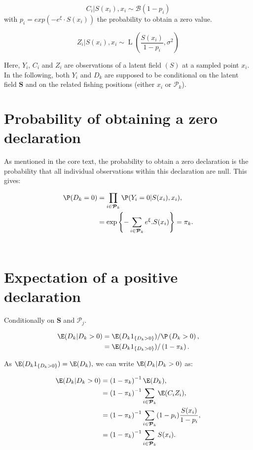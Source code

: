 \[C_{i} \vert S(x_i),x_i \sim \mathcal{B}(1-p_{i})\]
with \(p_{i}=exp(-e^\xi \cdot S(x_{i}))\) the probability to obtain a zero value.

\[Z_{i} \vert S(x_i),x_i \sim \operatorname{L}(\frac{S(x_{i})}{1-p_{i}},\sigma^2)\]

Here, \(Y_{i}\), \(C_{i}\) and \(Z_{i}\) are observations of a latent field $(S)$ at a sampled point \(x_{i}\). In the following, both \(Y_i\) and \(D_k\) are supposed to be conditional on the latent field \(\bm{S}\) and on the related fishing positions (either \(x_i\) or \(\boldsymbol{\mathcal{P}}_k\)). \\

\section{Probability of obtaining a zero declaration}

As mentioned in the core text, the probability to obtain a zero declaration is the probability that all individual observations within this declaration are null. This gives:

\begin{align*}
\P(D_k = 0) & = \prod_{i \in \boldsymbol{\mathcal{P}}_k} \P(Y_{i} = 0 \vert  S(x_i), x_i),\nonumber \\
                      & = \exp{ \left \lbrace- \sum_{i \in \boldsymbol{\mathcal{P}}_k} e^{\xi}. S(x_{i})\right \rbrace} = \pi_k.
\end{align*} \\

\newpage
\section{Expectation of a positive declaration}

Conditionally on \(\bm{S}\) and \(\boldsymbol{\mathcal{P}}_j\).

\begin{align*}
\E(D_k \vert D_k > 0) & = \E(D_k 1_{ \left \lbrace D_k > 0\right\rbrace } )  / \P\left ( D_k > 0\right ),   \\
& = \E(D_k 1_{ \left \lbrace D_k > 0\right\rbrace } )  / \left (1-\pi_k\right).   \\
\end{align*}

As \(\E(D_k 1_{ \left \lbrace D_k > 0\right\rbrace } ) = \E(D_k ),\) we can write \(\E(D_k\vert D_k > 0)\) as:

\begin{align*}
\E(D_k\vert D_k > 0) & = \left (1- \pi_k\right)^{-1} \E(D_k)   ,   \nonumber \\
& = \left (1- \pi_k\right)^{-1} \sum_{i \in \boldsymbol{\mathcal{P}}_k} \E(C_{i} Z_{i}),\nonumber \\
& = \left (1- \pi_k\right)^{-1} \sum_{i \in \boldsymbol{\mathcal{P}}_k} (1-p_{i}) \frac{S(x_{i})}{1-p_{i}}, \nonumber \\
& = \left (1- \pi_k\right)^{-1}\sum_{i \in \boldsymbol{\mathcal{P}}_k} S(x_{i}).
\end{align*}


